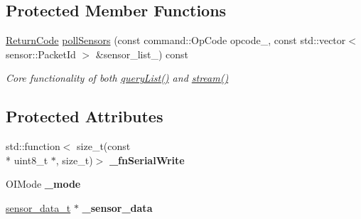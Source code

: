 \subsection*{Protected Member Functions}
\begin{DoxyCompactItemize}
\item 
\hyperlink{classroomba_1_1series500_1_1_open_interface_a43fc2ae1216e57cfb46901331b9ab4c7}{Return\+Code} \hyperlink{classroomba_1_1series500_1_1_open_interface_a92e659d63fe2191abd702a4c23326969}{poll\+Sensors} (const command\+::\+Op\+Code opcode\+\_\+, const std\+::vector$<$ sensor\+::\+Packet\+Id $>$ \&sensor\+\_\+list\+\_\+) const 
\begin{DoxyCompactList}\small\item\em Core functionality of both \hyperlink{classroomba_1_1series500_1_1_open_interface_aeb6ba5e140e821bb0cf1c9dd70465fc0}{query\+List()} and \hyperlink{classroomba_1_1series500_1_1_open_interface_a990642768282c49110d83da52a4f8e6f}{stream()} \end{DoxyCompactList}\end{DoxyCompactItemize}
\subsection*{Protected Attributes}
\begin{DoxyCompactItemize}
\item 
\hypertarget{classroomba_1_1series500_1_1_open_interface_adc93297613591cfdb94229ac1da0befd}{std\+::function$<$ size\+\_\+t(const \\*
uint8\+\_\+t $\ast$, size\+\_\+t)$>$ {\bfseries \+\_\+fn\+Serial\+Write}}\label{classroomba_1_1series500_1_1_open_interface_adc93297613591cfdb94229ac1da0befd}

\item 
\hypertarget{classroomba_1_1series500_1_1_open_interface_a2491dd5d1efe4358d7d5b76e272163c3}{O\+I\+Mode {\bfseries \+\_\+mode}}\label{classroomba_1_1series500_1_1_open_interface_a2491dd5d1efe4358d7d5b76e272163c3}

\item 
\hypertarget{classroomba_1_1series500_1_1_open_interface_a127e0b53fc665ae71cbc3f15d45158f2}{\hyperlink{classroomba_1_1series500_1_1_open_interface_a292dd23045ef4827673822518f08fb0f}{sensor\+\_\+data\+\_\+t} $\ast$ {\bfseries \+\_\+sensor\+\_\+data}}\label{classroomba_1_1series500_1_1_open_interface_a127e0b53fc665ae71cbc3f15d45158f2}

\end{DoxyCompactItemize}



